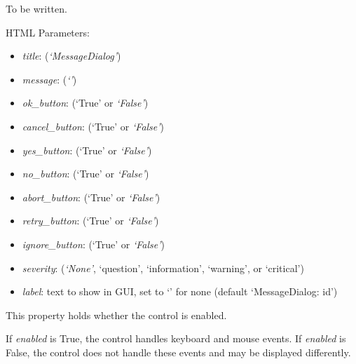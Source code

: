 \documentclass[letterpaper,10pt,english]{sphinxmanual}
\begin{document}
\begin{fulllineitems}
\label{api:controls.MessageDialog}
To be written.

HTML Parameters:
\begin{itemize}
\item {} 
\emph{title}: (\emph{`MessageDialog'})

\item {} 
\emph{message}: (\emph{`'})

\item {} 
\emph{ok\_button}: (`True' or \emph{`False'})

\item {} 
\emph{cancel\_button}: (`True' or \emph{`False'})

\item {} 
\emph{yes\_button}: (`True' or \emph{`False'})

\item {} 
\emph{no\_button}: (`True' or \emph{`False'})

\item {} 
\emph{abort\_button}: (`True' or \emph{`False'})

\item {} 
\emph{retry\_button}: (`True' or \emph{`False'})

\item {} 
\emph{ignore\_button}: (`True' or \emph{`False'})

\item {} 
\emph{severity}: (\emph{`None'}, `question', `information', `warning', or `critical')

\item {} 
\emph{label}: text to show in GUI, set to `' for none (default `MessageDialog: id')

\end{itemize}

\begin{fulllineitems}
\label{api:controls.MessageDialog.enabled}
This property holds whether the control is enabled.

If \emph{enabled} is True, the control handles keyboard and mouse events.
If \emph{enabled} is False, the control does not handle these events and may
be displayed differently.

\end{fulllineitems}



\end{fulllineitems}
\end{document}
